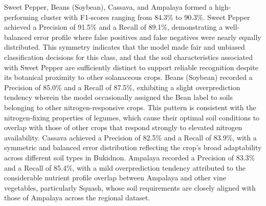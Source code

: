 {	Sweet Pepper, Beans (Soybean), Cassava, and Ampalaya formed a high-performing cluster with F1-scores ranging from 84.3\% to 90.3\%. Sweet Pepper achieved a Precision of 91.5\% and a Recall of 89.1\%, demonstrating a well-balanced error profile where false positives and false negatives were nearly equally distributed. This symmetry indicates that the model made fair and unbiased classification decisions for this class, and that the soil characteristics associated with Sweet Pepper are sufficiently distinct to support reliable recognition despite its botanical proximity to other solanaceous crops. Beans (Soybean) recorded a Precision of 85.0\% and a Recall of 87.5\%, exhibiting a slight overprediction tendency wherein the model occasionally assigned the Bean label to soils belonging to other nitrogen-responsive crops. This pattern is consistent with the nitrogen-fixing properties of legumes, which cause their optimal soil conditions to overlap with those of other crops that respond strongly to elevated nitrogen availability. Cassava achieved a Precision of 82.5\% and a Recall of 83.9\%, with a symmetric and balanced error distribution reflecting the crop's broad adaptability across different soil types in Bukidnon. Ampalaya recorded a Precision of 83.3\% and a Recall of 85.4\%, with a mild overprediction tendency attributed to the considerable nutrient profile overlap between Ampalaya and other vine vegetables, particularly Squash, whose soil requirements are closely aligned with those of Ampalaya across the regional dataset.
	
}
